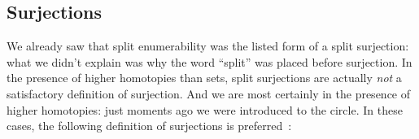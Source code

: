 \subsection{Surjections}
We already saw that split enumerability was the listed form of a split
surjection: what we didn't explain was why the word ``split'' was placed before
surjection.
In the presence of higher homotopies than sets, split surjections are actually
\emph{not} a satisfactory definition of surjection.
And we are most certainly in the presence of higher homotopies: just moments ago
we were introduced to the circle.
In these cases, the following definition of surjections is
preferred~\cite[definition 4.6.1]{hottbook}:
\begin{multicols}{2}
  \begin{agdalisting} \label{surj-eqn}
  \end{agdalisting} \columnbreak
  \begin{agdalisting} \label{surj-arrow-eqn}
  \end{agdalisting}
\end{multicols}

